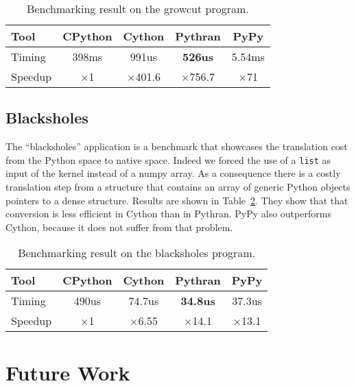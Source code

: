 \documentclass[10pt, onecolumn, preprint]{sigplanconf}
\begin{document}
\begin{table}
    \centering

    \begin{tabular}{|l|c|c|c|c|}
        \hline
     Tool    &  CPython    &   Cython     &     Pythran   &  PyPy \\
    \hline
    Timing  &  398ms   &   991us     &    \textbf{526us} &  5.54ms  \\
    \hline
    Speedup &  $\times$1         &    $\times$401.6      &    $\times$756.7   &  $\times$71    \\
    \hline
\end{tabular}
\caption{Benchmarking result on the growcut program.}
\label{tbl:growcut}

\end{table}

\subsection{Blacksholes}

The ``blacksholes'' application is a benchmark that showcases the
translation cost from the Python space to native space. Indeed we forced the
use of a \texttt{list} as input of the kernel instead of a numpy array. As a
consequence there is a costly translation step from a structure that contains
an array of generic Python objects pointers to a dense structure.
Results are shown in Table~\ref{tbl:black}. They show that that conversion is
less efficient in Cython than in Pythran. PyPy also outperforms Cython, because
it does not suffer from that problem.

\begin{table}
    \centering

    \begin{tabular}{|l|c|c|c|c|}
        \hline
     Tool    &  CPython    &   Cython     &     Pythran   &  PyPy \\
    \hline
    Timing  &  490us   &   74.7us     &    \textbf{34.8us} &  37.3us  \\
    \hline
    Speedup &  $\times$1         &    $\times$6.55      &    $\times$14.1   &  $\times$13.1    \\
    \hline
\end{tabular}
\caption{Benchmarking result on the blacksholes program.}
\label{tbl:black}

\end{table}

\section{Future Work}
\end{document}
